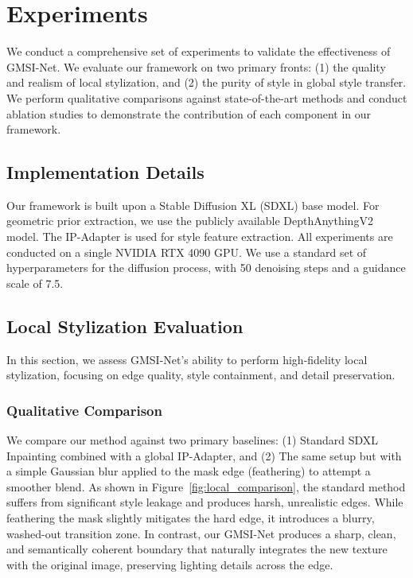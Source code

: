 \section{Experiments}

We conduct a comprehensive set of experiments to validate the effectiveness of GMSI-Net. We evaluate our framework on two primary fronts: (1) the quality and realism of local stylization, and (2) the purity of style in global style transfer. We perform qualitative comparisons against state-of-the-art methods and conduct ablation studies to demonstrate the contribution of each component in our framework.

\subsection{Implementation Details}
Our framework is built upon a Stable Diffusion XL (SDXL) base model. For geometric prior extraction, we use the publicly available DepthAnythingV2 model. The IP-Adapter is used for style feature extraction. All experiments are conducted on a single NVIDIA RTX 4090 GPU. We use a standard set of hyperparameters for the diffusion process, with 50 denoising steps and a guidance scale of 7.5.

\subsection{Local Stylization Evaluation}

In this section, we assess GMSI-Net's ability to perform high-fidelity local stylization, focusing on edge quality, style containment, and detail preservation.

\subsubsection{Qualitative Comparison}
We compare our method against two primary baselines: (1) Standard SDXL Inpainting combined with a global IP-Adapter, and (2) The same setup but with a simple Gaussian blur applied to the mask edge (feathering) to attempt a smoother blend. As shown in Figure~\ref{fig:local_comparison}, the standard method suffers from significant style leakage and produces harsh, unrealistic edges. While feathering the mask slightly mitigates the hard edge, it introduces a blurry, washed-out transition zone. In contrast, our GMSI-Net produces a sharp, clean, and semantically coherent boundary that naturally integrates the new texture with the original image, preserving lighting details across the edge.

